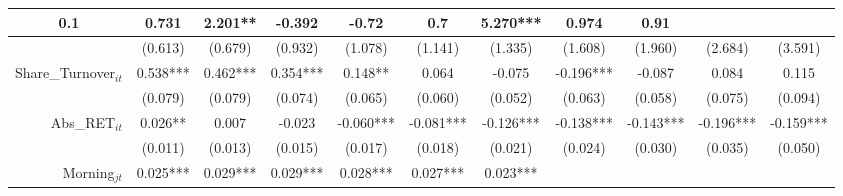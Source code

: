 \begin{table}
{\begin{tabular}{rcccccccccc}
  \multicolumn{1}{c|}{0.1} &
  \multicolumn{1}{c|}{0.731} &
  \multicolumn{1}{c|}{2.201**} &
  \multicolumn{1}{c|}{-0.392} &
  \multicolumn{1}{c|}{-0.72} &
  \multicolumn{1}{c|}{0.7} &
  \multicolumn{1}{c|}{5.270***} &
  \multicolumn{1}{c|}{0.974} &
  \multicolumn{1}{c|}{0.91} \\ \hline
\multicolumn{1}{|r|}{} &
  \multicolumn{1}{c|}{(0.613)} &
  \multicolumn{1}{c|}{(0.679)} &
  \multicolumn{1}{c|}{(0.932)} &
  \multicolumn{1}{c|}{(1.078)} &
  \multicolumn{1}{c|}{(1.141)} &
  \multicolumn{1}{c|}{(1.335)} &
  \multicolumn{1}{c|}{(1.608)} &
  \multicolumn{1}{c|}{(1.960)} &
  \multicolumn{1}{c|}{(2.684)} &
  \multicolumn{1}{c|}{(3.591)} \\ \hline
\multicolumn{1}{|r|}{Share\_Turnover$_{it}$} &
  \multicolumn{1}{c|}{0.538***} &
  \multicolumn{1}{c|}{0.462***} &
  \multicolumn{1}{c|}{0.354***} &
  \multicolumn{1}{c|}{0.148**} &
  \multicolumn{1}{c|}{0.064} &
  \multicolumn{1}{c|}{-0.075} &
  \multicolumn{1}{c|}{-0.196***} &
  \multicolumn{1}{c|}{-0.087} &
  \multicolumn{1}{c|}{0.084} &
  \multicolumn{1}{c|}{0.115} \\ \hline
\multicolumn{1}{|r|}{} &
  \multicolumn{1}{c|}{(0.079)} &
  \multicolumn{1}{c|}{(0.079)} &
  \multicolumn{1}{c|}{(0.074)} &
  \multicolumn{1}{c|}{(0.065)} &
  \multicolumn{1}{c|}{(0.060)} &
  \multicolumn{1}{c|}{(0.052)} &
  \multicolumn{1}{c|}{(0.063)} &
  \multicolumn{1}{c|}{(0.058)} &
  \multicolumn{1}{c|}{(0.075)} &
  \multicolumn{1}{c|}{(0.094)} \\ \hline
\multicolumn{1}{|r|}{Abs\_RET$_{it}$} &
  \multicolumn{1}{c|}{0.026**} &
  \multicolumn{1}{c|}{0.007} &
  \multicolumn{1}{c|}{-0.023} &
  \multicolumn{1}{c|}{-0.060***} &
  \multicolumn{1}{c|}{-0.081***} &
  \multicolumn{1}{c|}{-0.126***} &
  \multicolumn{1}{c|}{-0.138***} &
  \multicolumn{1}{c|}{-0.143***} &
  \multicolumn{1}{c|}{-0.196***} &
  \multicolumn{1}{c|}{-0.159***} \\ \hline
\multicolumn{1}{|r|}{} &
  \multicolumn{1}{c|}{(0.011)} &
  \multicolumn{1}{c|}{(0.013)} &
  \multicolumn{1}{c|}{(0.015)} &
  \multicolumn{1}{c|}{(0.017)} &
  \multicolumn{1}{c|}{(0.018)} &
  \multicolumn{1}{c|}{(0.021)} &
  \multicolumn{1}{c|}{(0.024)} &
  \multicolumn{1}{c|}{(0.030)} &
  \multicolumn{1}{c|}{(0.035)} &
  \multicolumn{1}{c|}{(0.050)} \\ \hline
\multicolumn{1}{|r|}{Morning$_{jt}$} &
  \multicolumn{1}{c|}{0.025***} &
  \multicolumn{1}{c|}{0.029***} &
  \multicolumn{1}{c|}{0.029***} &
  \multicolumn{1}{c|}{0.028***} &
  \multicolumn{1}{c|}{0.027***} &
  \multicolumn{1}{c|}{0.023***} &

\end{tabular}}
\end{table}
